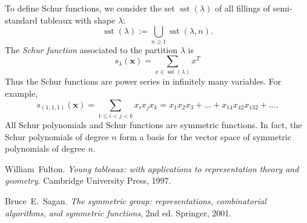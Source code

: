 \documentclass[12pt]{article}
\DeclareMathOperator{\sst}{sst}
\begin{document}
To define Schur functions, we consider the set $\sst(\lambda)$ of all
fillings of semi-standard tableaux with shape $\lambda$:
\[
\sst(\lambda) := \bigcup_{n\ge 1} \sst(\lambda, n).
\]
The \emph{Schur function} associated to the partition $\lambda$ is
\[
s_{\lambda}(\mathbf{x}) = \sum_{x\in\sst(\lambda)} x^T
\]
Thus the Schur functions are power series in infinitely many
variables.  For example,
\[
s_{(1,1,1)}(\mathbf{x}) = \sum_{1\le i < j < k} x_i x_j x_k = x_1 x_2 x_3 + \dots + x_{14} x_{42} x_{132} + \dots.
\]
All Schur polynomials and Schur functions are symmetric functions.  In
fact, the Schur polynomials of degree $n$ form a basis for the vector space of
symmetric polynomials of degree $n$.

\begin{thebibliography}{99}
William~Fulton. \emph{Young tableaux: with applications to
representation theory and geometry}. Cambridge University Press, 1997.

Bruce~E.~Sagan. \emph{The symmetric group: representations,
combinatorial algorithms, and symmetric functions}, 2nd ed. Springer,
2001.
\end{thebibliography}
\end{document}
